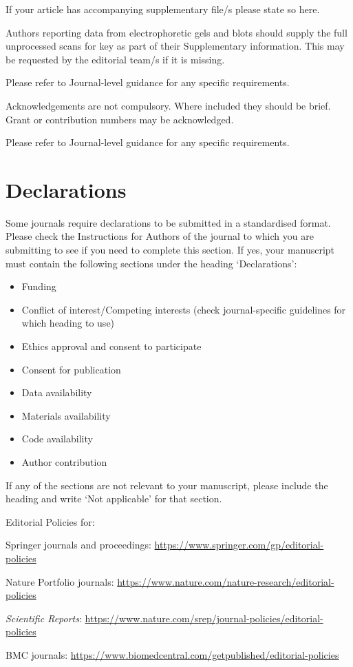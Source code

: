 \documentclass[pdflatex,sn-mathphys-num]{sn-jnl}%
\theoremstyle{thmstyleone}%
\theoremstyle{thmstyletwo}%
\theoremstyle{thmstylethree}%
\begin{document}
If your article has accompanying supplementary file/s please state so here. 

Authors reporting data from electrophoretic gels and blots should supply the full unprocessed scans for key as part of their Supplementary information. This may be requested by the editorial team/s if it is missing.

Please refer to Journal-level guidance for any specific requirements.


Acknowledgements are not compulsory. Where included they should be brief. Grant or contribution numbers may be acknowledged.

Please refer to Journal-level guidance for any specific requirements.

\section*{Declarations}

Some journals require declarations to be submitted in a standardised format. Please check the Instructions for Authors of the journal to which you are submitting to see if you need to complete this section. If yes, your manuscript must contain the following sections under the heading `Declarations':

\begin{itemize}
\item Funding
\item Conflict of interest/Competing interests (check journal-specific guidelines for which heading to use)
\item Ethics approval and consent to participate
\item Consent for publication
\item Data availability 
\item Materials availability
\item Code availability 
\item Author contribution
\end{itemize}

\noindent
If any of the sections are not relevant to your manuscript, please include the heading and write `Not applicable' for that section. 

\bigskip
\begin{flushleft}%
Editorial Policies for:

\bigskip\noindent
Springer journals and proceedings: \url{https://www.springer.com/gp/editorial-policies}

\bigskip\noindent
Nature Portfolio journals: \url{https://www.nature.com/nature-research/editorial-policies}

\bigskip\noindent
\textit{Scientific Reports}: \url{https://www.nature.com/srep/journal-policies/editorial-policies}

\bigskip\noindent
BMC journals: \url{https://www.biomedcentral.com/getpublished/editorial-policies}
\end{flushleft}
\end{document}
